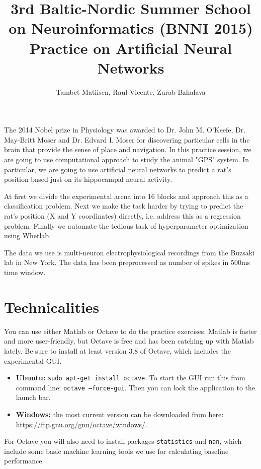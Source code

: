 \documentclass[a4paper,11pt]{article}
\author{\large{Tambet Matiisen, Raul Vicente, Zurab Bzhalava}}
\title{\huge{3rd Baltic-Nordic Summer School on Neuroinformatics (BNNI 2015)}\\\LARGE{Practice on Artificial Neural Networks}}
\begin{document}
\maketitle

%
%
The 2014 Nobel prize in Physiology was awarded to Dr. John M. O'Keefe, Dr. May-Britt Moser and Dr. Edvard I. Moser for discovering particular cells in the brain that provide the sense of place and navigation. In this practice session, we are going to use computational approach to study the animal "GPS" system. In particular, we are going to use artificial neural networks to predict a rat's position based just on its hippocampal neural activity.

At first we divide the experimental arena into 16 blocks and approach this as a classification problem. Next we make the task harder by trying to predict the rat's position (X and Y coordinates) directly, i.e. address this as a regression problem. Finally we automate the tedious task of hyperparameter optimization using Whetlab. 

The data we use is multi-neuron electrophysiological recordings from the Buzsaki lab in New York. The data has been preprocessed as number of spikes in 500ms time window.

%
%
\section{Technicalities}

You can use either Matlab or Octave to do the practice exercises. Matlab is faster and more user-friendly, but Octave is free and has been catching up with Matlab lately. Be sure to install at least version 3.8 of Octave, which includes the experimental GUI.
\begin{itemize}
	\item \textbf{Ubuntu:} \texttt{sudo apt-get install octave}. To start the GUI run this from command line: \texttt{octave --force-gui}. Then you can lock the application to the launch bar. 
	\item \textbf{Windows:} the most current version can be downloaded from here:\\ \url{https://ftp.gnu.org/gnu/octave/windows/}.
\end{itemize}

For Octave you will also need to install packages \texttt{statistics} and \texttt{nan}, which include some basic machine learning tools we use for calculating baseline performance. 
\end{document}
